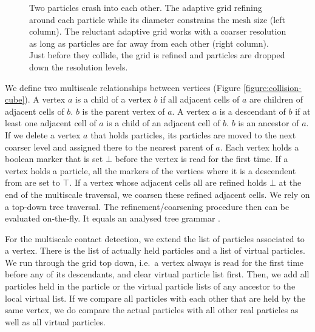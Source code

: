 \begin{figure}
\begin{center}
 \end{center}
 \caption{
   Two particles crash into each other.
   The adaptive grid refining around each particle while its diameter
   constrains the mesh size (left column).
   The reluctant adaptive grid works with a coarser resolution as long
   as particles are far away from each other (right column).
   Just before they collide, the grid is refined and particles are dropped down
   the resolution levels.
 }
 \label{figure:adaptive-vs-reluctant-grid}
\end{figure}

We define two multiscale relationships between vertices (Figure
\ref{figure:collision-cube}).
A vertex $a$ is a child of a vertex $b$ if all adjacent cells of $a$ are
children of adjacent cells of $b$. $b$ is the parent vertex of $a$.
A vertex $a$ is a descendant of $b$ if at least one adjacent cell of $a$ is a
child of an adjacent cell of $b$. $b$ is an ancestor of $a$.
If we delete a vertex $a$ that holds particles, its particles are moved to the
next coarser level and assigned there to the nearest parent of $a$.
Each vertex holds a boolean marker that is set $\bot $ before the vertex is
read for the first time.
If a vertex holds a particle, all the markers of the vertices where it is a
descendent from are set to $\top$.
If a vertex whose adjacent cells all are refined holds $\bot$ at the end of the
multiscale traversal, we coarsen these refined adjacent cells.
We rely on a top-down tree traversal.
The refinement/coarsening procedure then can be evaluated on-the-fly.
It equals an analysed tree grammar \cite{Knuth71}.

For the multiscale contact detection, we extend the list of particles associated
to a vertex. 
There is the list of actually held particles and a list of virtual particles. 
We run through the grid top down, i.e.~a vertex always is read for the first
time before any of its descendants, and clear virtual particle list first.
Then, we add all particles held in the particle or the virtual particle lists of
any ancestor to the local virtual list.
If we compare all particles with each other that are held by the same vertex, we
do compare the actual particles with all other real particles as well as all
virtual particles.

